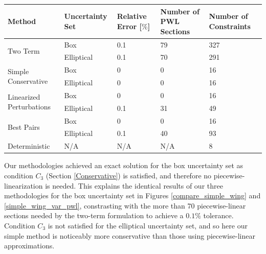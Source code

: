 \begin{center}
\begin{tabular}{ |m{7em}|m{1.8cm}|m{1.5cm}|m{2.2cm}|m{1.8cm}| }
\hline
Method & Uncertainty Set & Relative Error [$\%$] & Number of PWL Sections & Number of Constraints \\
\hline
\multirow{2}{7em}{Two Term} & Box & 0.1 & 79 & 327\\ 
& Elliptical & 0.1 & 70 & 291\\
\hline
\multirow{2}{7em}{Simple Conservative} & Box & 0 & 0 & 16\\ 
& Elliptical & 0 & 0 & 16 \\
\hline
\multirow{2}{7em}{Linearized Perturbations} & Box & 0 & 0 & 16\\ 
& Elliptical & 0.1 & 31 & 49 \\  
\hline
\multirow{2}{7em}{Best Pairs} & Box & 0 & 0 & 16\\ 
& Elliptical & 0.1 & 40 & 93 \\
\hline
Deterministic & N/A & N/A & N/A & 8\\
\hline
\end{tabular}
\label{simp_table}
\end{center}

Our methodologies achieved an exact solution for the box uncertainty set as condition $C_3$ (Section \ref{Conservative}) is satisfied, and therefore no piecewise-linearization is needed. This explains the identical results of our three methodologies for the box uncertainty set in Figures \ref{compare_simple_wing} and \ref{simple_wing_var_pwl}, constrasting with the more than 70 piecewise-linear sections needed by the two-term formulation to achieve a $0.1\%$ tolerance. Condition $C_3$ is not satisfied for the elliptical uncertainty set, and so here our simple method is noticeably more conservative than those using piecewise-linear approximations.


